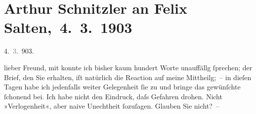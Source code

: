 

\renewcommand{\erwaehntePersonen}{Personen: Otto Brahm, Paul Goldmann, Mirjam Horwitz, Adolf Lantz, Emil Lessing, Theodore Rottenberg, Felix Salten, Ottilie Salten, Olga Schnitzler, Julius Schnitzler, Curt Wigand}
\renewcommand{\erwaehnteInstitutionen}{Institutionen: Die Zeit}
\renewcommand{\erwaehnteOrte}{Orte: Berlin, Wien}
\renewcommand{\erwaehnteWerke}{Werke: Der Schleier der Beatrice. Schauspiel in fünf Akten, Tagebuch}
\section[ Arthur Schnitzler an Felix Salten, 4. 3. 1903]{Arthur Schnitzler an Felix Salten, 4. 3. 1903}
\nopagebreak{}
\rehead{ }\normalsize\beginnumbering{}
\toendnotes[C]{\smallbreak\pagebreak[2]}
\toendnotes[C]{\smallbreak}
\pstart
           \raggedleft{}{\pb}4. \textcolor{gray}{3}. 903.\pend
           
\pstart
           lieber Freund, mit \label{K_L02980-1v}\label{K_L02980-1h} konnte ich bisher kaum hundert Worte unauffällg ſprechen; der Brief, den Sie
               erhalten, iſt natürlich die Reaction auf meine Mittheilg; – in dieſen Tagen habe ich
               jedenfalls weiter Gelegenheit ſie zu \label{K_L02980-2v}\label{K_L02980-2h} und bringe das gewünſchte ſchonend bei. Ich habe nicht den Eindruck, daſs
               Gefahren drohen. Nicht »Verlogenheit«, aber naive Unechtheit ſozuſagen. Glauben Sie
               nicht? –\pend
           
